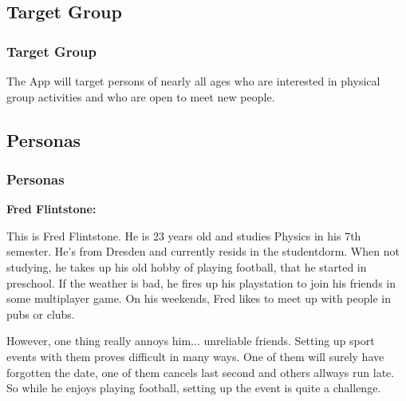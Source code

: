 \documentclass[aspectratio=169]{beamer}
\begin{document}
\subsection{Target Group}
\begin{frame}   
\frametitle{Target Group}
The App will target persons of nearly all ages who are interested in physical group activities and who are open to meet new people. 
\end{frame}


\subsection{Personas}
\begin{frame}   
	\frametitle{Personas}{\textbf{Fred Flintstone:}}

	This is Fred Flintstone. He is 23 years old and studies Physics in his 7th semester. 
	He's from Dresden and currently resids in the studentdorm. 
	When not studying, he takes up his old hobby of playing football, that he started in preschool. If the weather is bad, he fires up his playstation to join his friends in some multiplayer game.
	On his weekends, Fred likes to meet up with people in pubs or clubs.

	However, one thing really annoys him... unreliable friends. Setting up sport events with them proves difficult in many ways.
	One of them will surely have forgotten the date, one of them cancels last second and others allways run late.
	So while he enjoys playing football, setting up the event is quite a challenge.
\end{frame}
\end{document}
